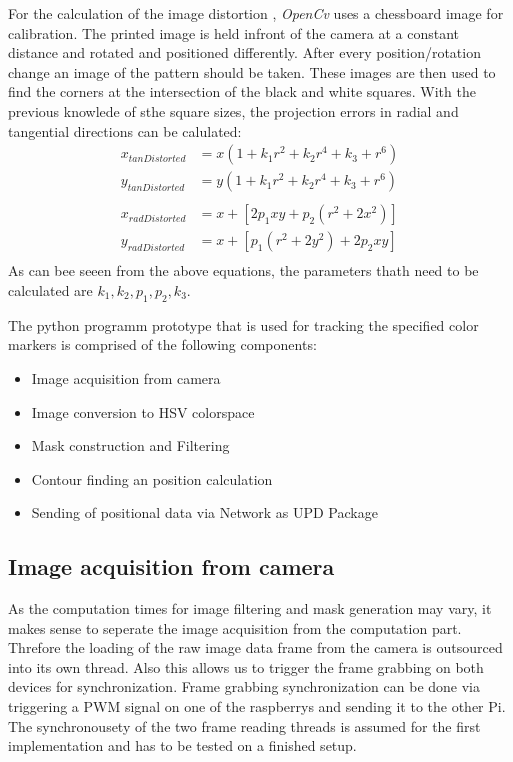 For the calculation of the image distortion , \textit{OpenCv} uses a chessboard image for calibration. The printed image is held infront of the camera at a constant distance and rotated and positioned differently. After every position/rotation change an image of the pattern should be taken.
These images are then used to find the corners at the intersection of the black and white squares. With the previous knowlede of sthe square sizes, the projection errors in radial and tangential directions can be calulated:
\begin{equation}
\begin{split}
x_{tanDistorted}&=x(1+k_{1}r^{2}+k_{2}r^{4}+k_{3}+r^{6})\\
y_{tanDistorted}&=y(1+k_{1}r^{2}+k_{2}r^{4}+k_{3}+r^{6})\\
\\
x_{radDistorted}&=x+[2p_{1}xy+p_{2}(r^{2}+2x^{2})]\\
y_{radDistorted}&=x+[p_{1}(r^{2}+2y^{2})+2p_{2}xy]\\
\end{split}
\end{equation} 
As can bee seeen from the above equations, the parameters thath need to be calculated are $k_{1},k_{2},p_{1},p_{2},k_{3}$.

The python programm prototype that is used for tracking the specified color markers is comprised of the following components:
\begin{itemize}
\item Image acquisition from camera
\item Image conversion to HSV colorspace
\item Mask construction and Filtering
\item Contour finding an position calculation
\item Sending of positional data via Network as UPD Package
\end{itemize}

\subsection{Image acquisition from camera}
As the computation times for image filtering and mask generation may vary, it makes sense to seperate the image acquisition from the computation part. Threfore the loading of the raw image data frame from the camera is outsourced into its own thread. Also this allows us to trigger the frame grabbing on both devices for synchronization. Frame grabbing synchronization can be done via triggering a PWM signal on one of the raspberrys and sending it to the other Pi.
The synchronousety of the two frame reading threads is assumed for the first implementation and has to be tested on a finished setup.\\

